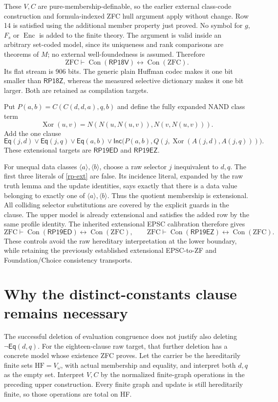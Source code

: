 \documentclass[11pt]{article}
\newcommand{\Eq}{\mathsf{Eq}}
\newcommand{\Inc}{\mathsf{Inc}}
\newcommand{\Con}{\operatorname{Con}}
\newcommand{\cl}[1]{\langle#1\rangle}
\newcommand{\RPZ}{\mathsf{RP18Z}}
\newcommand{\RPV}{\mathsf{RP18V}}
\newcommand{\RPE}{\mathsf{RP19ED}}
\newcommand{\RPEZ}{\mathsf{RP19EZ}}
\begin{document}
These $V,C$ are pure-membership-definable, so the earlier external
class-code construction and formula-indexed ZFC hull argument apply
without change. Row 14 is satisfied using the additional member
property just proved. No symbol for $g$, $F_s$ or $\operatorname{Enc}$
is added to the finite theory. The argument is valid inside an arbitrary
set-coded model, since its uniqueness and rank comparisons are theorems
of $M$; no external well-foundedness is assumed. Therefore
\[
 \mathrm{ZFC}\vdash\Con(\RPV)\leftrightarrow\Con(\mathrm{ZFC}).
\]
Its flat stream is 906 bits. The generic plain Huffman codec makes it
one bit smaller than $\RPZ$, whereas the measured selective dictionary
makes it one bit larger. Both are retained as compilation targets.

Put $P(a,b)=C(C(d,d,a),q,b)$ and define the fully expanded NAND class term
\[
 \operatorname{Xor}(u,v)=N(N(u,N(u,v)),N(v,N(u,v))).
\]
Add the one clause
\begin{equation}\label{rp-ext}
 \Eq(j,d)\lor\Eq(j,q)\lor\Eq(a,b)
 \lor\Inc\bigl(P(a,b),Q(j,\operatorname{Xor}(A(j,d),A(j,q)))\bigr).
\end{equation}
These extensional targets are $\RPE$ and $\RPEZ$.

For unequal data classes $\cl a,\cl b$, choose a raw selector $j$
inequivalent to $d,q$. The first three literals of
\eqref{rp-ext} are false. Its incidence literal, expanded by the raw
truth lemma and the update identities, says exactly that there is a
data value belonging to exactly one of $\cl a,\cl b$. Thus the
quotient membership is extensional. All colliding selector substitutions
are covered by the explicit guards in the clause. The upper model is
already extensional and satisfies the added row by the same profile
identity. The inherited extensional EPSC calibration therefore gives
\[
 \mathrm{ZFC}\vdash\Con(\RPE)\leftrightarrow\Con(\mathrm{ZFC}),
 \qquad
 \mathrm{ZFC}\vdash\Con(\RPEZ)\leftrightarrow\Con(\mathrm{ZFC}).
\]
These controls avoid the raw hereditary interpretation at the lower
boundary, while retaining the previously established extensional
EPSC-to-ZF and Foundation/Choice consistency transports.

\section{Why the distinct-constants clause remains necessary}

The successful deletion of evaluation congruence does not justify
also deleting $\neg\Eq(d,q)$. For the eighteen-clause raw target,
that further deletion has a concrete model whose existence ZFC proves.
Let the carrier be the hereditarily finite sets $\mathrm{HF}=V_\omega$,
with actual membership and equality, and interpret both $d,q$ as the
empty set. Interpret $V,C$ by the normalized finite-graph operations
in the preceding upper construction. Every finite graph and update
is still hereditarily finite, so those operations are total on HF.
\end{document}
